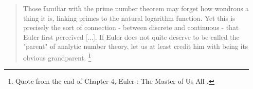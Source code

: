 \begin{quotation}
    Those familiar with the prime number theorem may forget how wondrous a thing it is, linking primes to the natural logarithm function. Yet this is precisely the sort of connection - between discrete and continuous - that Euler first perceived [...]. If Euler does not quite deserve to be called the "parent" of analytic number theory, let us at least credit him with being its obvious grandparent. \footnote{Quote from the end of Chapter 4, Euler : The Master of Us All \cite{dunham1999euler}. }
\end{quotation}